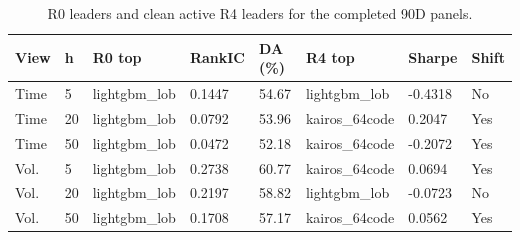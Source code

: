 \begin{table}[t]
\centering
\caption{R0 leaders and clean active R4 leaders for the completed 90D panels.}
\label{tab:table_02_r0_r4_leaders}
\begin{tabular}{llllllll}
\toprule
View & h & R0 top & RankIC & DA (\%) & R4 top & Sharpe & Shift \\
\midrule
Time & 5 & lightgbm\_lob & 0.1447 & 54.67 & lightgbm\_lob & -0.4318 & No \\
Time & 20 & lightgbm\_lob & 0.0792 & 53.96 & kairos\_64code & 0.2047 & Yes \\
Time & 50 & lightgbm\_lob & 0.0472 & 52.18 & kairos\_64code & -0.2072 & Yes \\
Vol. & 5 & lightgbm\_lob & 0.2738 & 60.77 & kairos\_64code & 0.0694 & Yes \\
Vol. & 20 & lightgbm\_lob & 0.2197 & 58.82 & lightgbm\_lob & -0.0723 & No \\
Vol. & 50 & lightgbm\_lob & 0.1708 & 57.17 & kairos\_64code & 0.0562 & Yes \\
\bottomrule
\end{tabular}
\end{table}
